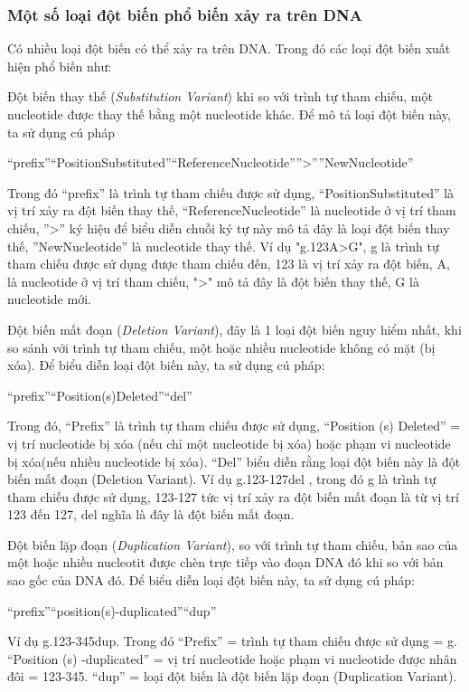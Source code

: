 \documentclass[../DoAn.tex]{subfiles}
\begin{document}
\subsubsection{Một số loại đột biến phổ biến xảy ra trên DNA}
Có nhiều loại đột biến có thể xảy ra trên DNA. Trong đó các loại đột biến xuất hiện phổ biến như: 

Đột biến thay thế (\textit{Substitution Variant}) khi so với trình tự tham chiếu, một nucleotide được thay thế bằng một nucleotide khác. Để mô tả loại đột biến này, ta sử dụng cú pháp \begin{center}“prefix”“PositionSubstituted”“ReferenceNucleotide””>””NewNucleotide”\end{center}
 Trong đó “prefix” là trình tự tham chiếu được sử dụng, “PositionSubstituted” là vị trí xảy ra đột biến thay thế, “ReferenceNucleotide” là nucleotide ở vị trí tham chiếu, ”>” ký hiệu để biểu diễn chuỗi ký tự này mô tả đây là loại đột biến thay thế, ”NewNucleotide” là nucleotide thay thế. Ví dụ "g.123A>G", g là trình tự tham chiếu được sử dụng được tham chiếu đến, 123 là vị trí xảy ra đột biến, A, là nucleotide ở vị trí tham chiếu, ">" mô tả đây là đột biến thay thế, G là nucleotide mới.

 Đột biến mất đoạn (\textit{Deletion Variant}), đây là 1 loại đột biến nguy hiểm nhất, khi so sánh với trình tự tham chiếu, một hoặc nhiều nucleotide không có mặt (bị xóa). Để biểu diễn loại đột biến này, ta sử dụng cú pháp: 
 \begin{center}“prefix”“Position(s)Deleted”“del”\end{center}
Trong đó, “Prefix” là trình tự tham chiếu được sử dụng, “Position (s) Deleted” = vị trí nucleotide bị xóa (nếu chỉ một nucleotide bị xóa) hoặc phạm vi nucleotide bị xóa(nếu nhiều nucleotide bị xóa). “Del” biểu diễn rằng loại đột biến này là đột biến mất đoạn (Deletion Variant). Ví dụ g.123-127del , trong đó g là trình tự tham chiếu được sử dụng, 123-127 tức vị trí xảy ra đột biến mất đoạn là từ vị trí 123 đến 127, del nghĩa là đây là đột biến mất đoạn.

 Đột biến lặp đoạn (\textit{Duplication Variant}), so với trình tự tham chiếu, bản sao của một hoặc nhiều nucleotit được chèn trực tiếp vào đoạn DNA đó khi so với bản sao gốc của DNA đó. Để biểu diễn loại đột biến này, ta sử dụng cú pháp: 
 \begin{center}“prefix”“position(s)-duplicated”“dup”\end{center}
Ví dụ  g.123-345dup. Trong đó “Prefix” = trình tự tham chiếu được sử dụng = g. “Position (s) -duplicated” = vị trí nucleotide hoặc phạm vi nucleotide được nhân đôi = 123-345. “dup” = loại đột biến là đột biến lặp đoạn (Duplication Variant).
\end{document}
